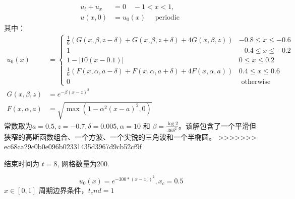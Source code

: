 \documentclass{book}
\begin{document}
\begin{example}
\begin{example}{}{}
\begin{example}
\begin{example}
\begin{example}
\begin{example}
\begin{example}{}{}
\begin{equation}
\begin{aligned}
            u_{t}+u_{x} & =0 \quad-1<x<1,                    \\
            u(x, 0)     & =u_{0}(x) \quad \text { periodic }
        \end{aligned}
    \end{equation}
    其中：
    \begin{equation}
        \begin{aligned}
            u_{0}(x)        & =\begin{cases}
                                   \frac{1}{6}(G(x, \beta, z-\delta)+G(x, \beta, z+\delta)+4 G(x, \beta, z))    & -0.8 \leq x \leq-0.6 \\
                                   1                                                                            & -0.4 \leq x \leq-0.2 \\
                                   1-|10(x-0.1)|                                                                & 0 \leq x \leq 0.2    \\
                                   \frac{1}{6}(F(x, \alpha, a-\delta)+F(x, \alpha, a+\delta)+4 F(x, \alpha, a)) & 0.4 \leq x \leq 0.6  \\
                                   0                                                                            & \text { otherwise }
                               \end{cases} \\
            G(x, \beta, z)  & =e^{-\beta(x-z)^{2}}                                                                                 \\
            F(x, \alpha, a) & =\sqrt{\max \left(1-\alpha^{2}(x-a)^{2}, 0\right)}
        \end{aligned}
    \end{equation}
    常数取为$a=0.5, z=-0.7, \delta=0.005, \alpha=10$ 和 $\beta=\frac{\log 2}{36 \delta^{2}}$。该解包含了一个平滑但狭窄的高斯函数组合、一个方波、一个尖锐的三角波和一个半椭圆。
    >>>>>>> ec68ca29c0b0e096b02331435d3967d9cb52cf9f

    结束时间为 $t=8$, 网格数量为200.
\end{example}
\begin{example}{}{}
\cite{RN204}
\begin{equation}
    u_0(x) = e^{-300*(x-x_c)^2},x_c=0.5
\end{equation}
$x\in[0,1]$ 周期边界条件，$t_end=1$


\end{example}
\end{example}
\end{example}
\end{example}
\end{example}
\end{example}
\end{example}
\end{document}
